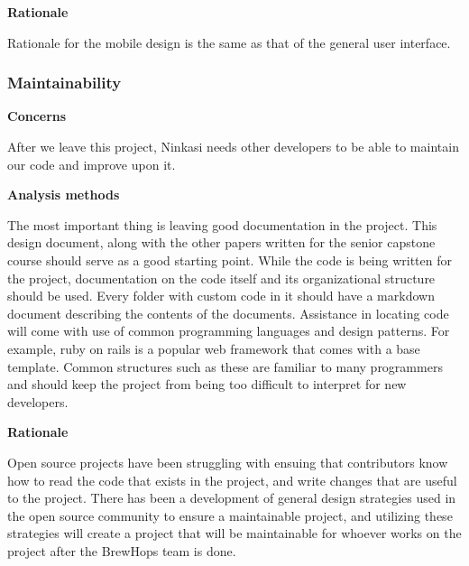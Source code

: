 \documentclass[draftclsnofoot,onecolumn,letterpaper,10pt]{IEEEtran}
\begin{document}
				\textbf{Rationale}

				Rationale for the mobile design is the same as that of the general user interface.

			\subsubsection{Maintainability}
				\textbf{Concerns}

				After we leave this project, Ninkasi needs other developers to be able to maintain our code and improve upon it.

				\textbf{Analysis methods}

				The most important thing is leaving good documentation in the project.
				This design document, along with the other papers written for the senior capstone course should serve as a good starting point.
				While the code is being written for the project, documentation on the code itself and its organizational structure should be used.
				Every folder with custom code in it should have a markdown document describing the contents of the documents.
				Assistance in locating code will come with use of common programming languages and design patterns.
				For example, ruby on rails is a popular web framework that comes with a base template.
				Common structures such as these are familiar to many programmers and should keep the project from being too difficult to interpret for new developers.

				\textbf{Rationale}

				Open source projects have been struggling with ensuing that contributors know how to read the code that exists in the project, and write changes that are useful to the project.
				There has been a development of general design strategies used in the open source community to ensure a maintainable project, and utilizing these strategies will create a project that will be maintainable for whoever works on the project after the BrewHops team is done.

				\clearpage
\end{document}

